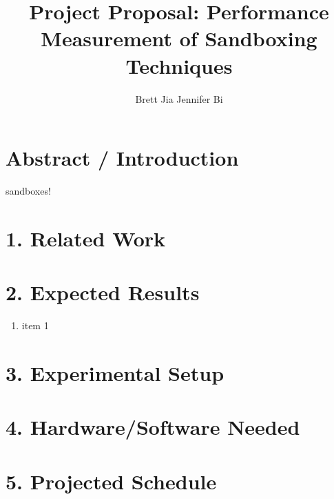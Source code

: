 \documentclass{proc}
\begin{document}
\title{Project Proposal: Performance Measurement of Sandboxing Techniques}

\author{Brett Jia \hspace{1em} Jennifer Bi}

\maketitle

\section*{Abstract / Introduction}

sandboxes!

\section*{1. Related Work}

\section*{2. Expected Results}

\begin{enumerate}
\item item 1 
\end{enumerate}

\section*{3. Experimental Setup}

\section*{4. Hardware/Software Needed}

\section*{5. Projected Schedule}






\end{document}

